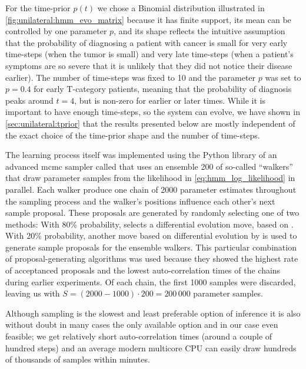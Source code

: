 \documentclass[\relativeRoot/main.tex]{subfiles}
\begin{document}
For the time-prior $p(t)$ we chose a Binomial distribution illustrated in \cref{fig:unilateral:hmm_evo_matrix} because it has finite support, its mean can be controlled by one parameter $p$, and its shape reflects the intuitive assumption that the probability of diagnosing a patient with cancer is small for very early time-steps (when the tumor is small) and very late time-steps (when a patient's symptoms are so severe that it is unlikely that they did not notice their disease earlier). The number of time-steps was fixed to 10 and the parameter $p$ was set to $p = 0.4$ for early T-category patients, meaning that the probability of diagnosis peaks around $t = 4$, but is non-zero for earlier or later times. While it is important to have enough time-steps, so the system can evolve, we have shown in \cref{sec:unilateral:tprior} that the results presented below are mostly independent of the exact choice of the time-prior shape and the number of time-steps.

The learning process itself was implemented using the Python library of an advanced \gls{mcmc} sampler called  \cite{foreman-mackey_emcee_2013} that uses an ensemble 200 of so-called ``walkers'' that draw parameter samples from the likelihood in \cref{eq:hmm_log_likelihood} in parallel. Each walker produce one chain of 2000 parameter estimates throughout the sampling process and the walker's positions influence each other's next sample proposal. These proposals are generated by randomly selecting one of two methods: With 80\% probability,  selects a differential evolution move, based on . With 20\% probability, another move based on differential evolution by  is used to generate sample proposals for the ensemble walkers. This particular combination of proposal-generating algorithms was used because they showed the highest rate of acceptanced proposals and the lowest auto-correlation times of the chains during earlier experiments. Of each chain, the first 1000 samples were discarded, leaving us with $S = (2000 - 1000) \cdot 200 = 200\,000$ parameter samples.

Although sampling is the slowest and least preferable option of inference it is also without doubt in many cases the only available option and in our case even feasible; we get relatively short auto-correlation times (around a couple of hundred steps) and an average modern multicore CPU can easily draw hundreds of thousands of samples within minutes.
\end{document}
